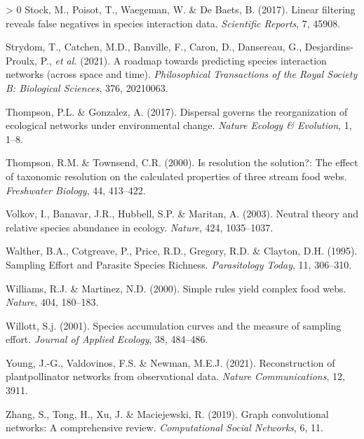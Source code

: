 \documentclass[10pt,oneside]{article}
\newlength{\cslhangindent}
\newenvironment{CSLReferences}[3] %
 {%
  \setlength{\parindent}{0pt}
  \ifodd #1 \everypar{\setlength{\hangindent}{\cslhangindent}}\ignorespaces\fi
  \ifnum #2 > 0
  \setlength{\parskip}{#2\baselineskip}
  \fi
 }%
 {}
\begin{document}
\begin{CSLReferences}{1}{0}
\leavevmode\hypertarget{ref-Stock2017LinFil}{}%
Stock, M., Poisot, T., Waegeman, W. \& De Baets, B. (2017). Linear
filtering reveals false negatives in species interaction data.
\emph{Scientific Reports}, 7, 45908.

\leavevmode\hypertarget{ref-Strydom2021RoaPre}{}%
Strydom, T., Catchen, M.D., Banville, F., Caron, D., Dansereau, G.,
Desjardins-Proulx, P., \emph{et al.} (2021). A roadmap towards
predicting species interaction networks (across space and time).
\emph{Philosophical Transactions of the Royal Society B: Biological
Sciences}, 376, 20210063.

\leavevmode\hypertarget{ref-Thompson2017DisGov}{}%
Thompson, P.L. \& Gonzalez, A. (2017). Dispersal governs the
reorganization of ecological networks under environmental change.
\emph{Nature Ecology \& Evolution}, 1, 1--8.

\leavevmode\hypertarget{ref-Thompson2000ResSol}{}%
Thompson, R.M. \& Townsend, C.R. (2000). Is resolution the solution?:
The effect of taxonomic resolution on the calculated properties of three
stream food webs. \emph{Freshwater Biology}, 44, 413--422.

\leavevmode\hypertarget{ref-Volkov2003NeuThe}{}%
Volkov, I., Banavar, J.R., Hubbell, S.P. \& Maritan, A. (2003). Neutral
theory and relative species abundance in ecology. \emph{Nature}, 424,
1035--1037.

\leavevmode\hypertarget{ref-Walther1995SamEff}{}%
Walther, B.A., Cotgreave, P., Price, R.D., Gregory, R.D. \& Clayton,
D.H. (1995). Sampling Effort and Parasite Species Richness.
\emph{Parasitology Today}, 11, 306--310.

\leavevmode\hypertarget{ref-Williams2000SimRul}{}%
Williams, R.J. \& Martinez, N.D. (2000). Simple rules yield complex food
webs. \emph{Nature}, 404, 180--183.

\leavevmode\hypertarget{ref-Willott2001SpeAcc}{}%
Willott, S.j. (2001). Species accumulation curves and the measure of
sampling effort. \emph{Journal of Applied Ecology}, 38, 484--486.

\leavevmode\hypertarget{ref-Young2021RecPla}{}%
Young, J.-G., Valdovinos, F.S. \& Newman, M.E.J. (2021). Reconstruction
of plantpollinator networks from observational data. \emph{Nature
Communications}, 12, 3911.

\leavevmode\hypertarget{ref-Zhang2019GraCon}{}%
Zhang, S., Tong, H., Xu, J. \& Maciejewski, R. (2019). Graph
convolutional networks: A comprehensive review. \emph{Computational
Social Networks}, 6, 11.

\end{CSLReferences}
\end{document}

